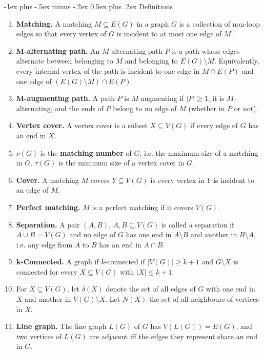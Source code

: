\documentclass[10pt,landscape]{article}
\makeatletter
\renewcommand{\section}{\@startsection{section}{1}{0mm}%
                                {-1ex plus -.5ex minus -.2ex}%
                                {0.5ex plus .2ex}%
                                {\normalfont\large\bfseries}}
\makeatother
\begin{document}
\begin{multicols}{3}
\section{Definitions}
\begin{enumerate}
	\item \textbf{Matching.} A matching \( M \subseteq E(G) \) in a graph \( G \) is a collection of non-loop edges so that every vertex of \( G \) is incident to at most one edge of \( M \).
	\item \textbf{M-alternating path.} An \( M \)-alternating path \( P \) is a path whose edges alternate between belonging to \( M \) and belonging to \( E(G) \setminus M \). Equivalently, every internal vertex of the path is incident to one edge in \( M \cap E(P) \) and one edge of \( (E(G) \setminus M) \cap E(P). \)
	\item \textbf{M-augmenting path.} A path \( P \) is \( M \)-augmenting if \( |P| \geq 1 \), it is \( M \)-alternating, and the ends of \( P \) belong to no edge of \( M \) (whether in \( P \) or not).
	\item \textbf{Vertex cover.} A vertex cover is a subset \( X \subseteq V(G) \) if every edge of \( G \) has an end in \( X \).
	\item \( \nu (G) \) is the \textbf{matching number} of \( G \), i.e. the maximum size of a matching in \( G \). \( \tau (G) \) is the minimum size of a vertex cover in \( G \).
	\item \textbf{Cover.} A matching \( M \) covers \( Y \subseteq V(G) \) is every vertex in \( Y \) is incident to an edge of \( M \).
	\item \textbf{Perfect matching.} \( M \) is a perfect matching if it covers \( V(G) \).
	\item \textbf{Separation.} A pair \( (A,B) \), \( A,B \subseteq V(G) \) is called a separation if \( A \cup B = V(G) \) and no edge of \( G \) has one end in \( A \setminus B \) and another in \( B \setminus A \), i.e. any edge from \( A \) to \( B \) has an end in \( A \cap B \).
	\item \textbf{k-Connected.} A graph if \( k \)-connected if \( |V(G)| \geq k +1  \) and \( G \setminus X \) is connected for every \( X \subseteq V(G) \) with \( |X| \leq k+1. \)
	\item For \( X \subseteq V(G) \), let \( \delta (X) \) denote the set of all edges of \( G \) with one end in \( X \) and another in \( V(G) \setminus X \). Let \( N(X) \) the set of all neighbours of vertices in \( X \).
	\item \textbf{Line graph.} The line graph \( L(G) \) of \( G \) has \( V(L(G)) = E(G) \), and two vertices of \( L(G) \) are adjacent iff the edges they represent share an end in \( G \).

\end{enumerate}
\end{multicols}
\end{document}

